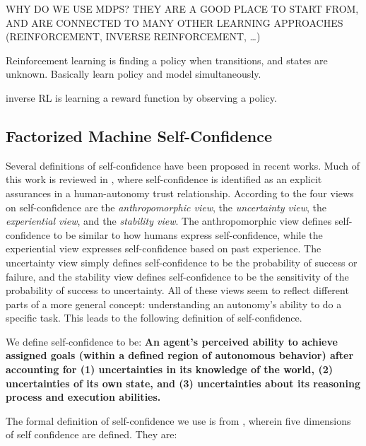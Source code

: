     WHY DO WE USE MDPS? THEY ARE A GOOD PLACE TO START FROM, AND ARE CONNECTED TO MANY OTHER LEARNING APPROACHES (REINFORCEMENT, INVERSE REINFORCEMENT, \ldots)

    Reinforcement learning is finding a policy when transitions, and states are unknown. Basically learn policy and model simultaneously.

    inverse RL is learning a reward function by observing a policy.

\subsection{Factorized Machine Self-Confidence}
    Several definitions of self-confidence have been proposed in recent works. Much of this work is reviewed in \cite{Israelsen2017-ym}, where self-confidence is identified as an explicit assurances in a human-autonomy trust relationship. According to \cite{Sweet2016-tz} the four views on self-confidence are the \textit{anthropomorphic view}, the \textit{uncertainty view}, the \textit{experiential view}, and the \textit{stability view}. The anthropomorphic view defines self-confidence to be similar to how humans express self-confidence, while the experiential view expresses self-confidence based on past experience. The uncertainty view simply defines self-confidence to be the probability of success or failure, and the stability view defines self-confidence to be the sensitivity of the probability of success to uncertainty. All of these views seem to reflect different parts of a more general concept: understanding an autonomy's ability to do a specific task. This leads to the following definition of self-confidence.

    We define self-confidence to be: \textbf{An agent's perceived ability to achieve assigned goals (within a defined region of autonomous behavior) after accounting for (1) uncertainties in its knowledge of the world, (2) uncertainties of its own state, and (3) uncertainties about its reasoning process and execution abilities.}

    The formal definition of self-confidence we use is from \cite{Aitken2016-cv}, wherein five dimensions of self confidence are defined. They are:

